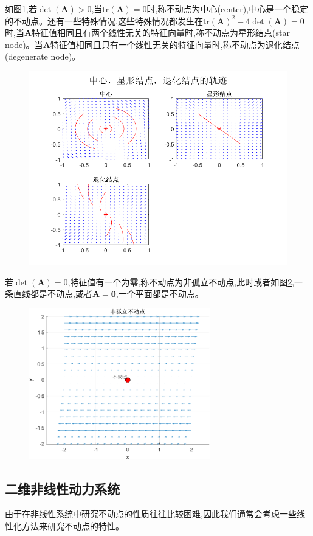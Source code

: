 如图\ref{fig:star},若$\det(\mathbf{A})>0$,当$\text{tr}(\mathbf{A})=0$时,称不动点为中心(center),中心是一个稳定的不动点。还有一些特殊情况,这些特殊情况都发生在$\text{tr}(\mathbf{A})^2-4\det(\mathbf{A})=0$时,当$\mathbf{A}$特征值相同且有两个线性无关的特征向量时,称不动点为星形结点(star node)。当$\mathbf{A}$特征值相同且只有一个线性无关的特征向量时,称不动点为退化结点(degenerate node)。
\begin{figure}[H]
    \centering
    \includegraphics[width=.7\linewidth]{Img/star.png}
    \label{fig:star}
\end{figure}

若$\det(\mathbf{A})=0$,特征值有一个为零,称不动点为非孤立不动点,此时或者如图\ref{fig:nonisolate},一条直线都是不动点,或者$\mathbf{A}=\mathbf{0}$,一个平面都是不动点。
\begin{figure}[H]
    \centering
    \includegraphics[width=0.7\textwidth]{Img/nonisolate.png}
    \label{fig:nonisolate}
\end{figure}
\subsection{二维非线性动力系统}
由于在非线性系统中研究不动点的性质往往比较困难,因此我们通常会考虑一些线性化方法来研究不动点的特性。

